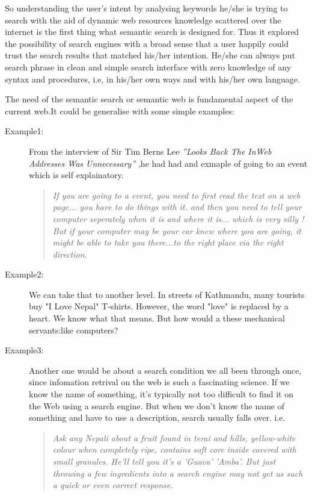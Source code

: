 \documentclass[12pt,a4]{article}
\begin{document}
So understanding the user's intent by analysing keywords he/she is trying to search with the aid of dynamic web resources knowledge scattered over the internet is the first thing what semantic search is designed for. Thus it explored the possibility of search engines with a broad sense that a user happily could trust the search results that matched his/her intention. He/she can always put search phrase in clean and simple search interface with zero knowledge of any syntax and procedures, i.e, in his/her own ways and with his/her own language.

The need of the semantic search or semantic web is fundamental aspect of the current web.It could be generalise with some simple examples:
\begin{description}
\item[Example1:] From the interview of Sir Tim Berns Lee \textit{''Looks Back The InWeb Addresses Was Unnecessary\cite{tim}''} ,he had had and exmaple of going to an event which is  self explainatory.
\begin{quote}	\textit{If you are going to a event, you need to first read the text on a web page... you have to do things with it. and then you need to tell your computer seperately when it is and where it is... which is very silly ! But if your computer may be your car knew where you are going, it might be able to take you there...to the right place via the right direction.}
\end{quote}

\item[Example2:] We can take that to another level. In streets of Kathmandu, many tourists buy "I Love Nepal" T-shirts. However, the word "love" is replaced by a heart. We know what that means. But how would a these mechanical servants:like computers?

\item[Example3:] Another one would be about a search condition we all been through once, since infomation retrival on the web is such a fascinating science. If we know the name of something, it's typically not too difficult to find it on the Web using a search engine. But when we don't know the name of something and have to use a description, search usually falls over. i.e.
\begin{quote}\textit{Ask any Nepali about a fruit found in terai and hills, yellow-white colour when completely ripe, contains soft core inside covered with small granules. He'll tell you it's a 'Guava' \textit{'Amba'}. But just throwing a few ingredients into a search engine may not get us such a quick or even correct response.}
\end{quote}
 
\end{description}
\end{document}
